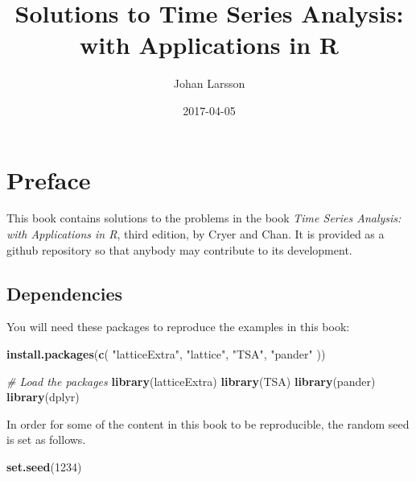 \documentclass[]{book}
\title{Solutions to Time Series Analysis: with Applications in R}
\author{Johan Larsson}
\date{2017-04-05}
\newenvironment{Shaded}{\begin{snugshade}}{\end{snugshade}}
\newcommand{\KeywordTok}[1]{\textcolor[rgb]{0.13,0.29,0.53}{\textbf{{#1}}}}
\newcommand{\DecValTok}[1]{\textcolor[rgb]{0.00,0.00,0.81}{{#1}}}
\newcommand{\StringTok}[1]{\textcolor[rgb]{0.31,0.60,0.02}{{#1}}}
\newcommand{\CommentTok}[1]{\textcolor[rgb]{0.56,0.35,0.01}{\textit{{#1}}}}
\newcommand{\NormalTok}[1]{{#1}}
\theoremstyle{definition}
\theoremstyle{definition}
\theoremstyle{remark}
\begin{document}
\maketitle

{
\setcounter{tocdepth}{1}
\tableofcontents
}
\chapter*{Preface}\label{preface}

This book contains solutions to the problems in the book \emph{Time
Series Analysis: with Applications in R}, third edition, by Cryer and
Chan. It is provided as a github repository so that anybody may
contribute to its development.

\section*{Dependencies}\label{dependencies}

You will need these packages to reproduce the examples in this book:

\begin{Shaded}
\begin{Highlighting}[]
\KeywordTok{install.packages}\NormalTok{(}\KeywordTok{c}\NormalTok{(}
  \StringTok{"latticeExtra"}\NormalTok{,}
  \StringTok{"lattice"}\NormalTok{,}
  \StringTok{"TSA"}\NormalTok{,}
  \StringTok{"pander"}
\NormalTok{))}
\end{Highlighting}
\end{Shaded}

\begin{Shaded}
\begin{Highlighting}[]
\CommentTok{# Load the packages}
\KeywordTok{library}\NormalTok{(latticeExtra)}
\KeywordTok{library}\NormalTok{(TSA)}
\KeywordTok{library}\NormalTok{(pander)}
\KeywordTok{library}\NormalTok{(dplyr)}
\end{Highlighting}
\end{Shaded}

In order for some of the content in this book to be reproducible, the
random seed is set as follows.

\begin{Shaded}
\begin{Highlighting}[]
\KeywordTok{set.seed}\NormalTok{(}\DecValTok{1234}\NormalTok{)}
\end{Highlighting}
\end{Shaded}
\end{document}
